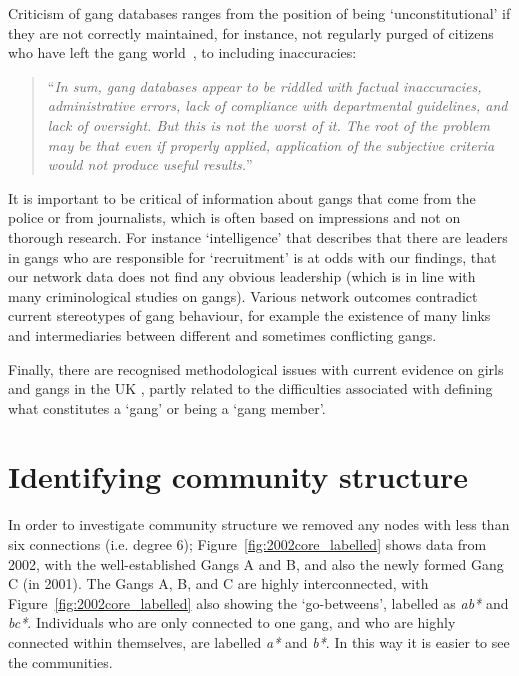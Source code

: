 \documentclass[twocolumn]{svjour3}          %
\theoremstyle{definition}
\begin{document}
Criticism of gang databases ranges from the position of being
`unconstitutional' if they are not correctly maintained, for instance,
not regularly purged of citizens who have left the gang
world~\citep{jacobs:2009}, to including inaccuracies:

\begin{quote}
``{\emph{In sum, gang databases appear to be riddled
with factual inaccuracies, administrative errors, lack of compliance
with departmental guidelines, and lack of oversight. But this is not
the worst of it. The root of the problem may be that even if properly
applied, application of the subjective criteria would not produce
useful results.}}''\\ \cite{wright:2005}
\end{quote}


It is important to be critical of information about gangs that come
from the police or from journalists, which is often based on
impressions and not on thorough research. For instance `intelligence'
that describes that there are leaders in gangs who are responsible for
`recruitment' is at odds with our findings, that our network data does
not find any obvious leadership (which is in line with many
criminological studies on gangs). Various network outcomes contradict
current stereotypes of gang behaviour, for example the existence of
many links and intermediaries between different and sometimes
conflicting gangs.

Finally, there are recognised methodological issues with current
evidence on girls and gangs in the UK \citep{batchelor:2009}, partly
related to the difficulties associated with defining what constitutes
a `gang' or being a `gang member'.


\section{Identifying community structure}\label{sec:communitystructure}

In order to investigate community structure we removed any nodes with
less than six connections (i.e. degree 6);
Figure~\ref{fig:2002core_labelled} shows data from 2002, with the
well-established Gangs A and B, and also the newly formed Gang C (in
2001). The Gangs A, B, and C are highly interconnected, with
Figure~\ref{fig:2002core_labelled} also showing the `go-betweens',
labelled as \emph{ab*} and \emph{bc*}. Individuals who are only
connected to one gang, and who are highly connected within themselves,
are labelled \emph{a*} and \emph{b*}. In this way it is easier to see
the communities.
\end{document}
